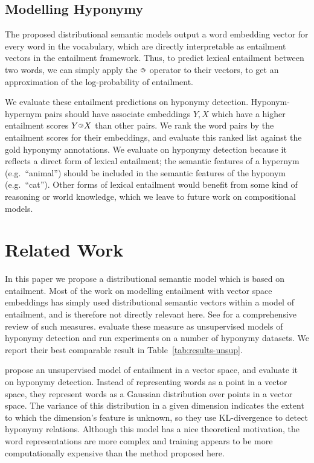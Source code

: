 \documentclass[11pt,a4paper]{article}
\newcommand{\bie}{{\raisebox{1.8pt}{\makebox[0pt][l]{\hspace{1.3pt}${\scriptscriptstyle >}$}${\scriptscriptstyle \bigcirc}$}}}
\begin{document}
\subsection{Modelling Hyponymy}

The proposed distributional semantic models output a word
embedding vector for every word in the vocabulary, which are directly
interpretable as entailment vectors in the entailment framework.  Thus, to
predict lexical entailment between two words, we can simply apply the $\bie$
operator to their vectors, to get an approximation of the log-probability of
entailment.  

We evaluate these entailment predictions on hyponymy detection.
Hyponym-hypernym pairs should have associate embeddings $Y,X$ which have a
higher entailment scores $Y\bie X$ than other pairs.  We rank the word pairs
by the entailment scores for their embeddings, and evaluate this ranked list
against the gold hyponymy annotations.
We evaluate on hyponymy detection because it reflects a direct form of
lexical entailment;
the semantic features of a hypernym (e.g.\ ``animal'') should be included in
the semantic features of the hyponym (e.g.\ ``cat'').  Other forms of lexical
entailment would benefit from some kind of reasoning or world knowledge, which
we leave to future work on compositional models.


\section{Related Work}
\label{sec:related}

In this paper we propose a distributional semantic model which is based on
entailment.  Most of the work on modelling entailment with vector space
embeddings has simply used distributional semantic vectors within a model of
entailment, and is therefore not directly relevant here.  See
\citep{Shwartz17} for a comprehensive review of such measures.
\citet{Shwartz17} evaluate these measure as unsupervised models of hyponymy
detection and run experiments on a number of hyponymy datasets.
We report their best comparable result in Table~\ref{tab:results-unsup}.


\citet{Vilnis15} propose an unsupervised model of entailment in a vector
space, and evaluate it on hyponymy detection.  Instead of representing words
as a point in a vector 
space, they represent words as a Gaussian distribution over points in a vector
space.  The variance of this distribution in a given dimension indicates the
extent to which the dimension's feature is unknown, so they use KL-divergence
to detect hyponymy relations.
Although this model has a nice theoretical motivation, the word
representations are more complex and training appears to be more
computationally expensive than the method proposed here.
\end{document}
